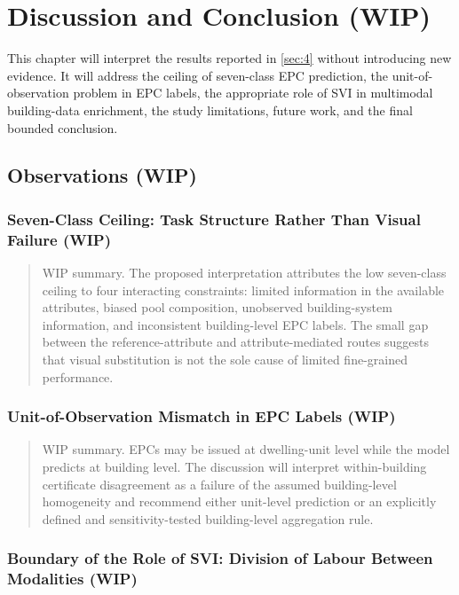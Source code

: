 \chapter{Discussion and Conclusion (WIP)}
\label{ch:5}
\label{sec:5}


This chapter will interpret the results reported in \cref{sec:4} without introducing new evidence. It will address the ceiling of seven-class EPC prediction, the unit-of-observation problem in EPC labels, the appropriate role of SVI in multimodal building-data enrichment, the study limitations, future work, and the final bounded conclusion.


\section{Observations (WIP)}
\label{sec:5_1}


\subsection{Seven-Class Ceiling: Task Structure Rather Than Visual Failure (WIP)}
\label{sec:5_1_1}


\begin{quote}
WIP summary. The proposed interpretation attributes the low seven-class ceiling to four interacting constraints: limited information in the available attributes, biased pool composition, unobserved building-system information, and inconsistent building-level EPC labels. The small gap between the reference-attribute and attribute-mediated routes suggests that visual substitution is not the sole cause of limited fine-grained performance.
\end{quote}


\subsection{Unit-of-Observation Mismatch in EPC Labels (WIP)}
\label{sec:5_1_2}


\begin{quote}
WIP summary. EPCs may be issued at dwelling-unit level while the model predicts at building level. The discussion will interpret within-building certificate disagreement as a failure of the assumed building-level homogeneity and recommend either unit-level prediction or an explicitly defined and sensitivity-tested building-level aggregation rule.
\end{quote}


\subsection{Boundary of the Role of SVI: Division of Labour Between Modalities (WIP)}
\label{sec:5_1_3}


